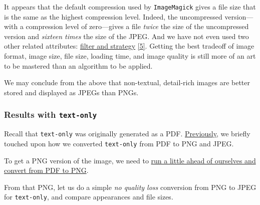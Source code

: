 \documentclass[
  12pt,
  british,
  a4paper,
  rgb,
  dvipsnames,
  svgnames,
  hyphens]{article}
\begin{document}
It appears that the default compression used by \texttt{ImageMagick}
gives a file size that is the same as the highest compression level.
Indeed, the uncompressed version---with a compression level of
zero---gives a file \emph{twice} the size of the uncompressed version
and \emph{sixteen times} the size of the JPEG. And we have not even used
two other related attributes:
\href{https://stackoverflow.com/questions/27267073/imagemagick-lossless-max-compression-for-png}{filter
and strategy} \protect\hyperlink{ref-setchell2014}{{[}5{]}}. Getting the
best tradeoff of image format, image size, file size, loading time, and
image quality is still more of an art to be mastered than an algorithm
to be applied.

We may conclude from the above that non-textual, detail-rich images are
better stored and displayed as JPEGs than PNGs.

\hypertarget{results-with-text-only}{%
\subsubsection{\texorpdfstring{Results with
\texttt{text-only}}{Results with text-only}}\label{results-with-text-only}}

Recall that \texttt{text-only} was originally generated as a PDF.
\protect\hyperlink{converting-text-only-from-pdf-to-png-and-jpeg}{Previously},
we briefly touched upon how we converted \texttt{text-only} from PDF to
PNG and JPEG.

To get a PNG version of the image, we need to
\protect\hyperlink{pdf-to-png-and-jpeg-poppler-and-cairo}{run a little
ahead of ourselves and convert from PDF to PNG}.

From that PNG, let us do a simple \emph{no quality loss} conversion from
PNG to JPEG for \texttt{text-only}, and compare appearances and file
sizes.
\end{document}
